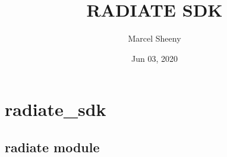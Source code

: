 \documentclass[letterpaper,10pt,english]{sphinxmanual}
\title{RADIATE SDK}
\date{Jun 03, 2020}
\author{Marcel Sheeny}
\begin{document}
\pagestyle{empty}
\sphinxmaketitle
\pagestyle{plain}
\sphinxtableofcontents
\pagestyle{normal}
\label{\detokenize{index::doc}}



\chapter{radiate\_sdk}
\label{\detokenize{modules:radiate-sdk}}\label{\detokenize{modules::doc}}

\section{radiate module}
\label{\detokenize{radiate:module-radiate}}\label{\detokenize{radiate:radiate-module}}\label{\detokenize{radiate::doc}}
\end{document}
